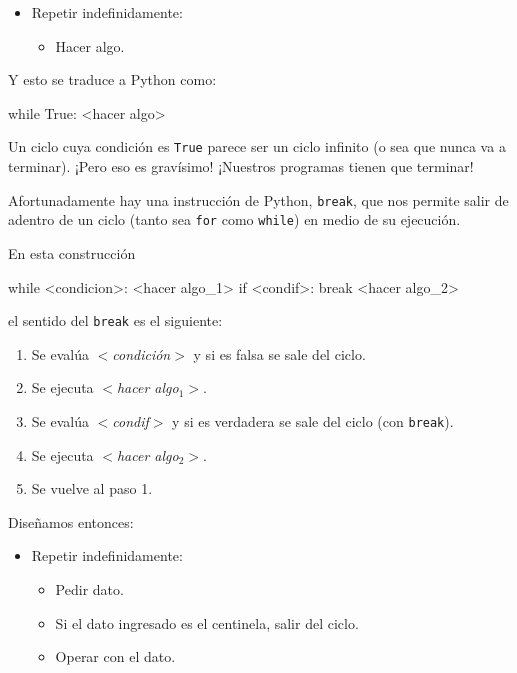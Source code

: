 \begin{itemize}
\item Repetir indefinidamente:
\begin{itemize}
\item Hacer algo.
\end{itemize}
\end{itemize}

Y esto se traduce a Python como:

\begin{codigo-python-sn}
while True:
    <hacer algo>
\end{codigo-python-sn}

Un ciclo cuya condición es \lstinline!True! parece ser un ciclo infinito (o
sea que nunca va a terminar). ¡Pero eso es gravísimo! ¡Nuestros programas
tienen que terminar!

Afortunadamente hay una instrucción de Python, \lstinline!break!, que nos
permite salir de adentro de un ciclo (tanto sea \lstinline!for! como
\lstinline!while!) en medio de su ejecución.

En esta construcción

\begin{codigo-python-sn}
while <condicion>:
    <hacer algo_1>
    if <condif>:
        break
    <hacer algo_2>
\end{codigo-python-sn}

el sentido del \lstinline!break! es el siguiente:

\begin{enumerate}
\item Se evalúa {\it $<$condición$>$} y si es falsa se sale del ciclo.
\item Se ejecuta {\it $<$hacer algo$_1>$}.
\item Se evalúa {\it $<$condif$>$} y si es verdadera se sale del ciclo (con \lstinline!break!).
\item Se ejecuta {\it $<$hacer algo$_2>$}.
\item Se vuelve al paso 1.
\end{enumerate}

Diseñamos entonces:

\begin{itemize}
\item Repetir indefinidamente:
\begin{itemize}
\item Pedir dato.
\item Si el dato ingresado es el centinela, salir del ciclo.
\item Operar con el dato.
\end{itemize}
\end{itemize}

